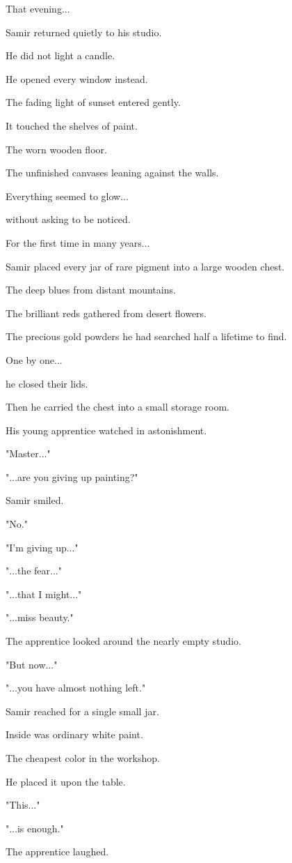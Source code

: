 \documentclass[12pt,openany]{book}
\begin{document}
That evening...

Samir returned quietly to his studio.

He did not light a candle.

He opened every window instead.

The fading light of sunset entered gently.

It touched the shelves of paint.

The worn wooden floor.

The unfinished canvases leaning against the walls.

Everything seemed to glow...

without asking to be noticed.

For the first time in many years...

Samir placed every jar of rare pigment into a large wooden chest.

The deep blues from distant mountains.

The brilliant reds gathered from desert flowers.

The precious gold powders he had searched half a lifetime to find.

One by one...

he closed their lids.

Then he carried the chest into a small storage room.

His young apprentice watched in astonishment.

"Master..."

"...are you giving up painting?"

Samir smiled.

"No."

"I'm giving up..."

"...the fear..."

"...that I might..."

"...miss beauty."

The apprentice looked around the nearly empty studio.

"But now..."

"...you have almost nothing left."

Samir reached for a single small jar.

Inside was ordinary white paint.

The cheapest color in the workshop.

He placed it upon the table.

"This..."

"...is enough."

The apprentice laughed.
\end{document}

